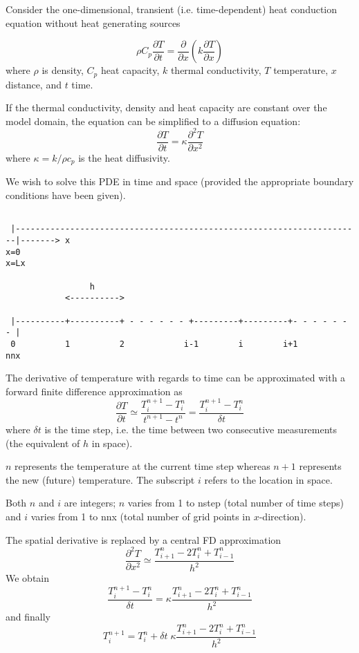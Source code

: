 Consider the one-dimensional, transient (i.e. time-dependent) 
heat conduction equation without heat generating sources

\[
\rho C_p \frac{\partial T}{\partial t} 
= \frac{\partial }{\partial x} \left(  k  \frac{\partial T}{\partial x} \right)
\]
where $\rho$ is density, $C_p$ heat capacity, $k$ thermal conductivity, $T$ temperature, 
$x$ distance, and $t$ time. 

If the thermal conductivity, density and heat capacity are constant over the model domain, 
the equation can be simplified to a diffusion equation:
\[
\frac{\partial T}{\partial t} =  \kappa \frac{\partial^2 T}{\partial x^2} 
\]
where $\kappa=k/\rho c_p$ is the heat diffusivity.

We wish to solve this PDE in time and space (provided the appropriate 
boundary conditions have been given). 

\begin{verbatim}

 |----------------------------------------------------------------------|-------> x
x=0                                                                    x=Lx

                 h
            <---------->
 
 |----------+----------+ - - - - - - +---------+---------+- - - - - - - | 
 0          1          2            i-1        i        i+1            nnx

\end{verbatim}

The derivative of temperature with regards to time can be approximated
with a forward finite difference approximation as
\[
\frac{\partial T}{\partial t} 
\simeq \frac{T_{i}^{n+1}-T_i^n}{t^{n+1}-t^n} 
= \frac{T_{i}^{n+1}-T_i^n}{\delta t} 
\]
where $\delta t$ is the time step, i.e. the time between two consecutive 
measurements (the equivalent of $h$ in space).

$n$ represents the temperature at the current time step whereas $n+1$
represents the new (future) temperature. The subscript $i$ refers to the location in space.

Both $n$ and $i$ are integers; $n$ varies from 1 to nstep (total number of time steps)
and $i$ varies from 1 to nnx (total number of grid points in $x$-direction).

The spatial derivative is replaced by a central FD approximation
\[
\frac{\partial^2 T}{\partial x^2} 
\simeq \frac{T_{i+1}^n - 2T_i^n + T_{i-1}^n}{h^2}
\]
We obtain
\[
\frac{T_{i}^{n+1}-T_i^n}{\delta t} 
= \kappa \frac{T_{i+1}^n - 2T_i^n + T_{i-1}^n}{h^2}
\]
and finally
\[
\boxed{
T_i^{n+1}=T_i^n + \delta t \; \kappa \frac{T_{i+1}^n - 2T_i^n + T_{i-1}^n}{h^2}
}
\]

